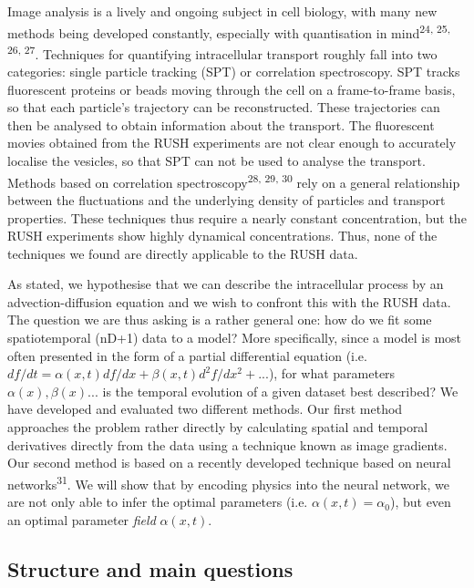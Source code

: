 \documentclass{Dissertate}
\begin{document}
Image analysis is a lively and ongoing subject in cell biology, with
many new methods being developed constantly, especially with
quantisation in
mind\textsuperscript{24, 25, 26, 27}.
Techniques for quantifying intracellular transport roughly fall into two
categories: single particle tracking (SPT) or correlation spectroscopy.
SPT tracks fluorescent proteins or beads moving through the cell on a
frame-to-frame basis, so that each particle's trajectory can be
reconstructed. These trajectories can then be analysed to obtain
information about the transport. The fluorescent movies obtained from
the RUSH experiments are not clear enough to accurately localise the
vesicles, so that SPT can not be used to analyse the transport. Methods
based on correlation
spectroscopy\textsuperscript{28, 29, 30} rely on a general relationship between the fluctuations and the
underlying density of particles and transport properties. These
techniques thus require a nearly constant concentration, but the RUSH
experiments show highly dynamical concentrations. Thus, none of the techniques we found
are directly applicable to the RUSH data.

As stated, we hypothesise that we can describe the intracellular process
by an advection-diffusion equation and we wish to confront this with the
RUSH data. The question we are thus asking is a rather general one: how
do we fit some spatiotemporal (nD+1) data to a model? More specifically,
since a model is most often presented in the form of a partial
differential equation (i.e.
\(df/dt = \alpha(x, t) df/dx+\beta(x, t) d^2f/dx^2+...\)), for what parameters
\(\alpha(x), \beta(x)...\) is the temporal evolution of a given dataset best
described? We have developed and evaluated two different methods. Our
first method approaches the problem rather directly by calculating
spatial and temporal derivatives directly from the data using a
technique known as image gradients. Our second method is based on a
recently developed technique based on neural
networks\textsuperscript{31}. We will show that by encoding physics into
the neural network, we are not only able to infer the optimal
parameters (i.e. $\alpha(x,t)=\alpha_0$), but even an optimal parameter \emph{field} $\alpha(x,t)$.

\hypertarget{structure-and-main-questions}{%
\subsection{Structure and main
questions}\label{structure-and-main-questions}}
\end{document}
